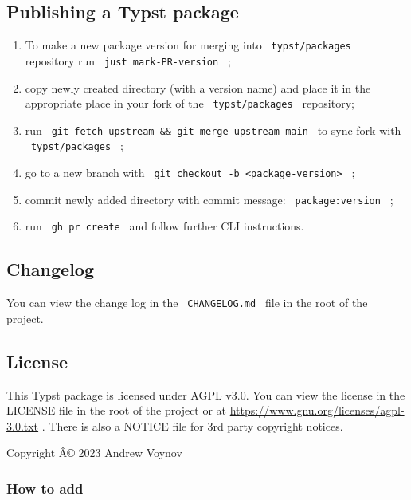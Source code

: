 \subsection{Publishing a Typst
package}\label{publishing-a-typst-package}

\begin{enumerate}
\tightlist
\item
  To make a new package version for merging into
  \texttt{\ typst/packages\ } repository run
  \texttt{\ just\ mark-PR-version\ } ;
\item
  copy newly created directory (with a version name) and place it in the
  appropriate place in your fork of the \texttt{\ typst/packages\ }
  repository;
\item
  run
  \texttt{\ git\ fetch\ upstream\ \&\&\ git\ merge\ upstream\ main\ } to
  sync fork with \texttt{\ typst/packages\ } ;
\item
  go to a new branch with
  \texttt{\ git\ checkout\ -b\ \textless{}package-version\textgreater{}\ }
  ;
\item
  commit newly added directory with commit message:
  \texttt{\ package:version\ } ;
\item
  run \texttt{\ gh\ pr\ create\ } and follow further CLI instructions.
\end{enumerate}

\subsection{Changelog}\label{changelog}

You can view the change log in the \texttt{\ CHANGELOG.md\ } file in the
root of the project.

\subsection{License}\label{license}

This Typst package is licensed under AGPL v3.0. You can view the license
in the LICENSE file in the root of the project or at
\url{https://www.gnu.org/licenses/agpl-3.0.txt} . There is also a NOTICE
file for 3rd party copyright notices.

Copyright Â© 2023 Andrew Voynov

\subsubsection{How to add}\label{how-to-add}

